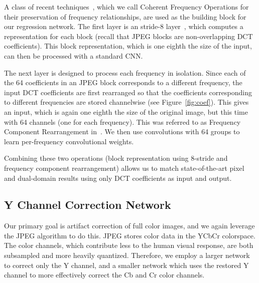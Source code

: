 \documentclass[runningheads]{llncs}
\begin{document}
A class of recent techniques~\cite{deguerre2019fast,lo2019exploring}, which we call Coherent Frequency Operations for their preservation of frequency relationships, are used as the building block for our regression network. The first layer is an  stride-8 layer~\cite{deguerre2019fast}, which computes a representation for each block (recall that JPEG blocks are non-overlapping  DCT coefficients). This block representation, which is one eighth the size of the input, can then be processed with a standard CNN. 

The next layer is designed to process each frequency in isolation. Since each of the 64 coefficients in an  JPEG block corresponds to a different frequency, the input DCT coefficients are first rearranged so that the coefficients corresponding to different frequencies are stored channelwise (see Figure~\ref{fig:coef}). This gives an input, which is again one eighth the size of the original image, but this time with 64 channels (one for each frequency). This was referred to as Frequency Component Rearrangement in~\cite{lo2019exploring}. We then use convolutions with 64 groups to learn per-frequency convolutional weights. 

Combining these two operations (block representation using  8-stride and frequency component rearrangement) allows us to match state-of-the-art pixel and dual-domain results using only DCT coefficients as input and output.

\subsection{Y Channel Correction Network}
\label{sec:app:y}
Our primary goal is artifact correction of full color images, and we again leverage the JPEG algorithm to do this. JPEG stores color data in the YCbCr colorspace. The color channels, which contribute less to the human visual response, are both subsampled and more heavily quantized. Therefore, we employ a larger network to correct only the Y channel, and a smaller network which uses the restored Y channel to more effectively correct the Cb and Cr color channels. 
\end{document}
